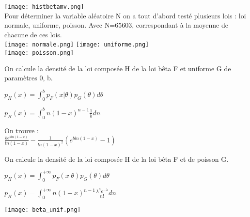 \documentclass[12pt]{article}
\begin{document}
\texttt{[image: histbetamv.png]}\\
Pour déterminer la variable aléatoire N on a tout d'abord testé plusieurs lois : loi normale, uniforme, poisson. 
Avec N=65603, correspondant à la moyenne de chacune de ces lois.
\\
\texttt{[image: normale.png]}
\texttt{[image: uniforme.png]}\\
\texttt{[image: poisson.png]}

On calcule la densité de la loi composée H de la loi bêta F et uniforme G de paramètres 0, b.

$p_{H}(x) = \int_{0}^{b} p_{F}(x|\theta) p_{G}(\theta)d\theta$

$p_{H}(x) = \int_{0}^{b}n(1-x)^{n-1}\frac{1}{b}dn$

On trouve : \\
$\frac{be^{bln(1-x)}}{ln(1-x)}-\frac{1}{ln(1-x)^2}(e^{bln(1-x)}-1)$

On calcule la densité de la loi composée H de la loi bêta F et de poisson G.


$p_{H}(x) = \int_{0}^{+\infty} p_{F}(x|\theta) p_{G}(\theta)d\theta$

$p_{H}(x) = \int_{0}^{+\infty}n(1-x)^{n-1}\frac{\lambda^{n}e^{-\lambda}}{n!}dn$


\texttt{[image: beta\_unif.png]}
\end{document}
